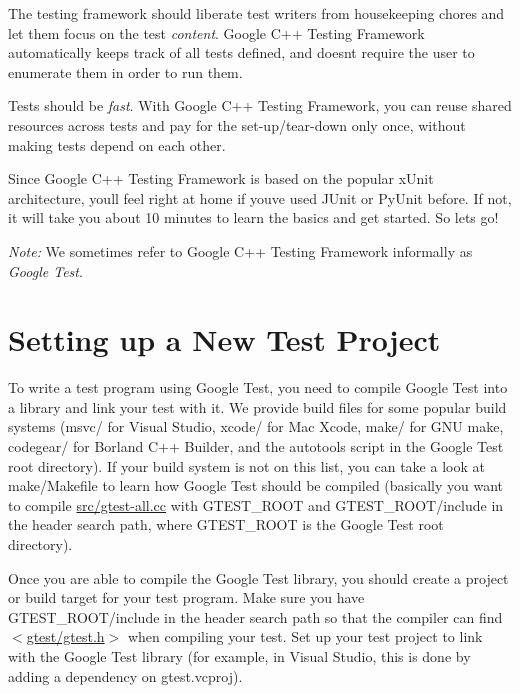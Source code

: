\begin{DoxyEnumerate}
\item The testing framework should liberate test writers from housekeeping chores and let them focus on the test {\itshape content}. Google C++ Testing Framework automatically keeps track of all tests defined, and doesn\textquotesingle{}t require the user to enumerate them in order to run them.
\end{DoxyEnumerate}
\begin{DoxyEnumerate}
\item Tests should be {\itshape fast}. With Google C++ Testing Framework, you can reuse shared resources across tests and pay for the set-\/up/tear-\/down only once, without making tests depend on each other.
\end{DoxyEnumerate}

Since Google C++ Testing Framework is based on the popular x\+Unit architecture, you\textquotesingle{}ll feel right at home if you\textquotesingle{}ve used J\+Unit or Py\+Unit before. If not, it will take you about 10 minutes to learn the basics and get started. So let\textquotesingle{}s go!

{\itshape Note\+:} We sometimes refer to Google C++ Testing Framework informally as {\itshape Google Test}.

\section*{Setting up a New Test Project}

To write a test program using Google Test, you need to compile Google Test into a library and link your test with it. We provide build files for some popular build systems ({\ttfamily msvc/} for Visual Studio, {\ttfamily xcode/} for Mac Xcode, {\ttfamily make/} for G\+NU make, {\ttfamily codegear/} for Borland C++ Builder, and the autotools script in the Google Test root directory). If your build system is not on this list, you can take a look at {\ttfamily make/\+Makefile} to learn how Google Test should be compiled (basically you want to compile {\ttfamily \hyperlink{gtest-all_8cc}{src/gtest-\/all.\+cc}} with {\ttfamily G\+T\+E\+S\+T\+\_\+\+R\+O\+OT} and {\ttfamily G\+T\+E\+S\+T\+\_\+\+R\+O\+O\+T/include} in the header search path, where {\ttfamily G\+T\+E\+S\+T\+\_\+\+R\+O\+OT} is the Google Test root directory).

Once you are able to compile the Google Test library, you should create a project or build target for your test program. Make sure you have {\ttfamily G\+T\+E\+S\+T\+\_\+\+R\+O\+O\+T/include} in the header search path so that the compiler can find {\ttfamily $<$\hyperlink{gtest_8h}{gtest/gtest.\+h}$>$} when compiling your test. Set up your test project to link with the Google Test library (for example, in Visual Studio, this is done by adding a dependency on {\ttfamily gtest.\+vcproj}).

